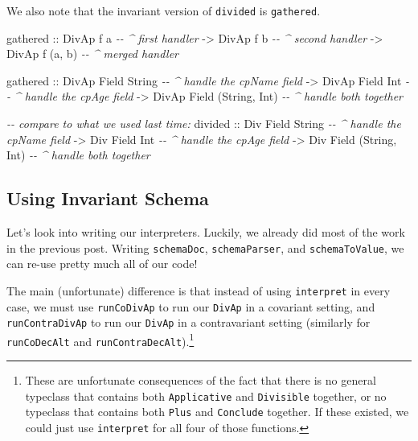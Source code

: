 \documentclass[]{article}
\newenvironment{Shaded}{}{}
\newcommand{\CommentTok}[1]{\textcolor[rgb]{0.38,0.63,0.69}{\textit{#1}}}
\newcommand{\DataTypeTok}[1]{\textcolor[rgb]{0.56,0.13,0.00}{#1}}
\newcommand{\NormalTok}[1]{#1}
\newcommand{\OtherTok}[1]{\textcolor[rgb]{0.00,0.44,0.13}{#1}}
\begin{document}
We also note that the invariant version of \texttt{divided} is
\texttt{gathered}.

\begin{Shaded}
\begin{Highlighting}[]
\NormalTok{gathered}
\OtherTok{    ::} \DataTypeTok{DivAp}\NormalTok{ f a          }\CommentTok{{-}{-} \^{} first handler}
    \OtherTok{{-}>} \DataTypeTok{DivAp}\NormalTok{ f b          }\CommentTok{{-}{-} \^{} second handler}
    \OtherTok{{-}>} \DataTypeTok{DivAp}\NormalTok{ f (a, b)     }\CommentTok{{-}{-} \^{} merged handler}

\NormalTok{gathered}
\OtherTok{    ::} \DataTypeTok{DivAp} \DataTypeTok{Field} \DataTypeTok{String}          \CommentTok{{-}{-} \^{} handle the cpName field}
    \OtherTok{{-}>} \DataTypeTok{DivAp} \DataTypeTok{Field} \DataTypeTok{Int}             \CommentTok{{-}{-} \^{} handle the cpAge field}
    \OtherTok{{-}>} \DataTypeTok{DivAp} \DataTypeTok{Field}\NormalTok{ (}\DataTypeTok{String}\NormalTok{, }\DataTypeTok{Int}\NormalTok{)   }\CommentTok{{-}{-} \^{} handle both together}

\CommentTok{{-}{-} compare to what we used last time:}
\NormalTok{divided}
\OtherTok{    ::} \DataTypeTok{Div} \DataTypeTok{Field} \DataTypeTok{String}          \CommentTok{{-}{-} \^{} handle the cpName field}
    \OtherTok{{-}>} \DataTypeTok{Div} \DataTypeTok{Field} \DataTypeTok{Int}             \CommentTok{{-}{-} \^{} handle the cpAge field}
    \OtherTok{{-}>} \DataTypeTok{Div} \DataTypeTok{Field}\NormalTok{ (}\DataTypeTok{String}\NormalTok{, }\DataTypeTok{Int}\NormalTok{)   }\CommentTok{{-}{-} \^{} handle both together}
\end{Highlighting}
\end{Shaded}

\hypertarget{using-invariant-schema}{%
\subsection{Using Invariant Schema}\label{using-invariant-schema}}

Let's look into writing our interpreters. Luckily, we already did most of the
work in the previous post. Writing \texttt{schemaDoc}, \texttt{schemaParser},
and \texttt{schemaToValue}, we can re-use pretty much all of our code!

The main (unfortunate) difference is that instead of using \texttt{interpret} in
every case, we must use \texttt{runCoDivAp} to run our \texttt{DivAp} in a
covariant setting, and \texttt{runContraDivAp} to run our \texttt{DivAp} in a
contravariant setting (similarly for \texttt{runCoDecAlt} and
\texttt{runContraDecAlt}).\footnote{These are unfortunate consequences of the
  fact that there is no general typeclass that contains both
  \texttt{Applicative} and \texttt{Divisible} together, or no typeclass that
  contains both \texttt{Plus} and \texttt{Conclude} together. If these existed,
  we could just use \texttt{interpret} for all four of those functions.}
\end{document}
